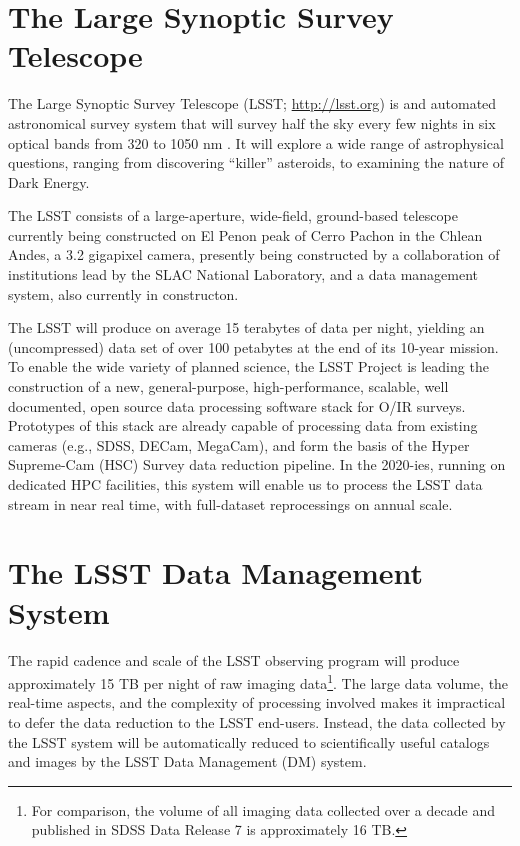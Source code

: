 \documentclass[11pt,twoside]{article}
\begin{document}
\section{ The Large Synoptic Survey Telescope }

The Large Synoptic Survey Telescope (LSST; \url{http://lsst.org}) is and
automated astronomical survey system that will survey half the
sky every few nights in six optical bands from 320 to 1050 nm \citep{2008arXiv0805.2366I}. It
will explore a wide range of astrophysical questions, ranging from discovering
``killer'' asteroids, to examining the nature of Dark Energy.

The LSST consists of a large-aperture, wide-field, ground-based telescope
currently being constructed on El Penon peak of Cerro Pachon in the Chlean
Andes, a 3.2 gigapixel camera, presently being constructed by a collaboration
of institutions lead by the SLAC National Laboratory, and a data management
system, also currently in constructon.

The LSST will produce on average 15 terabytes of data per night, yielding an
(uncompressed) data set of over 100 petabytes at the end of its 10-year
mission.  To enable the wide variety of planned science, the LSST Project is
leading the construction of a new, general-purpose, high-performance,
scalable, well documented, open source data processing software stack for
O/IR surveys.  Prototypes of this stack are already capable of processing
data from existing cameras (e.g., SDSS, DECam, MegaCam), and form the basis
of the Hyper Supreme-Cam (HSC) Survey data reduction pipeline.  In the
2020-ies, running on dedicated HPC facilities, this system will enable us to
process the LSST data stream in near real time, with full-dataset
reprocessings on annual scale.

\section{ The LSST Data Management System }
\label{sec:dm}

The rapid cadence and scale of the LSST observing program will produce
approximately 15 TB per night of raw imaging data\footnote{For
  comparison, the volume of all imaging data collected over a decade
  and published in SDSS Data Release 7 \citep{2009ApJS..182..543A} is approximately 16 TB.}. The large data volume, the real-time aspects, and the complexity of processing involved makes it impractical to defer the data reduction to the LSST end-users. Instead, the data collected by the LSST system will be automatically reduced to scientifically useful catalogs and images by the LSST Data Management (DM) system.
\\
\end{document}
